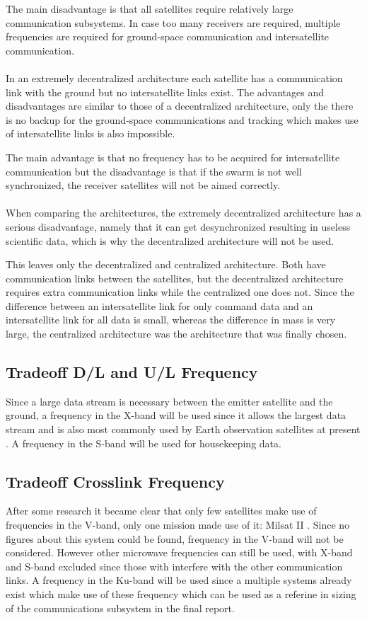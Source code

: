 The main disadvantage is that all satellites require relatively large communication subsystems. In case too many receivers are required, multiple frequencies are required for ground-space communication and intersatellite communication.\\\\
In an extremely decentralized architecture each satellite has a communication link with the ground but no intersatellite links exist.
The advantages and disadvantages are similar to those of a decentralized architecture, only the there is no backup for the ground-space communications and tracking which makes use of intersatellite links is also impossible.

The main advantage is that no frequency has to be acquired for intersatellite communication but the disadvantage is that if the swarm is not well synchronized, the receiver satellites will not be aimed correctly.\\\\
When comparing the architectures, the extremely decentralized architecture has a serious disadvantage, namely that it can get desynchronized resulting in useless scientific data, which is why the decentralized architecture will not be used.

This leaves only the decentralized and centralized architecture. Both have communication links between the satellites, but the decentralized architecture requires extra communication links while the centralized one does not. Since the difference between an intersatellite link for only command data and an intersatellite link for all data is small, whereas the difference in mass is very large, the centralized architecture was the architecture that was finally chosen.

\subsection{Tradeoff D/L and U/L Frequency}
Since a large data stream is necessary between the emitter satellite and the ground, a frequency in the X-band will be used since it allows the largest data stream and is also most commonly used by Earth observation satellites at present \cite{icesattech} \cite{landsatcom}. A frequency in the S-band will be used for housekeeping data.

\subsection{Tradeoff Crosslink Frequency}
After some research it became clear that only few satellites make use of frequencies in the V-band, only one mission made use of it: Milsat II \cite{milstar}. Since no figures about this system could be found, frequency in the V-band will not be considered.
However other microwave frequencies can still be used, with X-band and S-band excluded since those with interfere with the other communication links. A frequency in the Ku-band will be used since a multiple systems already exist which make use of these frequency which can be used as a referine in sizing of the communications subsystem in the final report.

